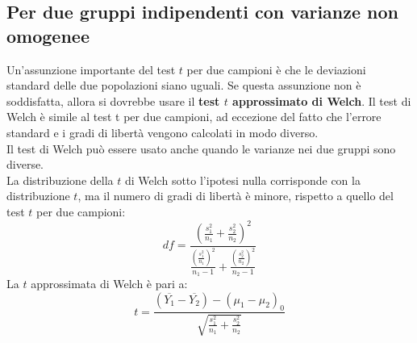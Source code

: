 \documentclass[10pt, draft]{book}
\begin{document}
\subsection{Per due gruppi indipendenti con varianze non omogenee}

Un'assunzione importante del test $t$ per due campioni è che le deviazioni standard delle due popolazioni siano uguali. Se questa assunzione non è soddisfatta, allora si dovrebbe usare il \textbf{test $t$ approssimato di Welch}. Il test di Welch è simile al test t per due campioni, ad eccezione del fatto che l'errore standard e i gradi di libertà vengono calcolati in modo diverso.
\\
Il test di Welch può essere usato anche quando le varianze nei due gruppi sono diverse.
\\
La distribuzione della $t$ di Welch sotto l'ipotesi nulla corrisponde con la distribuzione $t$, ma il numero di gradi di libertà è minore, rispetto a quello del test $t$ per due campioni:
\begin{equation}
    df = \frac{(\frac{s_1^2}{n_1}+\frac{s_2^2}{n_2})^2}{\frac{(\frac{s_1^2}{n_1})^2}{n_1-1}+\frac{(\frac{s_2^2}{n_2})^2}{n_2-1}}
\end{equation}
La $t$ approssimata di Welch è pari a:
\begin{equation}
    t = \frac{(\overline{Y_1}-\overline{Y_2})-(\mu_1-\mu_2)_0}{\sqrt{\frac{s_1^2}{n_1}+\frac{s_2^2}{n_2}}}
\end{equation}
\end{document}
